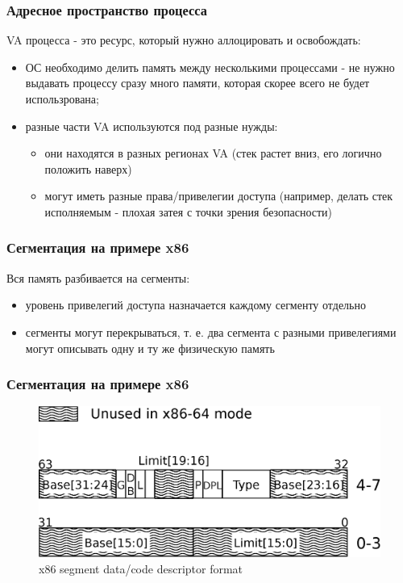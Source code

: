 \begin{frame}
\frametitle{Адресное пространство процесса}

VA процесса - это ресурс, который нужно аллоцировать и освобождать:
\begin{itemize}
  \item<2-> ОС необходимо делить память между несколькими процессами - не нужно
выдавать процессу сразу много памяти, которая скорее всего не будет
использрована;
  \item<3-> разные части VA используются под разные нужды:
    \begin{itemize}
      \item они находятся в разных регионах VA (стек растет вниз, его логично положить наверх)
      \item могут иметь разные права/привелегии доступа (например, делать стек исполняемым - плохая затея с точки зрения безопасности)
    \end{itemize}
\end{itemize}
\end{frame}

\begin{frame}
\frametitle{Сегментация на примере x86}

Вся память разбивается на сегменты:
\begin{itemize}
  \item уровень привелегий доступа назначается каждому сегменту отдельно
  \item сегменты могут перекрываться, т. е. два сегмента с разными привелегиями могут описывать одну и ту же физическую память
\end{itemize}

\end{frame}

\begin{frame}
\frametitle{Сегментация на примере x86}

\begin{figure}
\centering\includegraphics[width=.9\linewidth]{arch-segd}
\caption{x86 segment data/code descriptor format}
\end{figure}

\end{frame}

